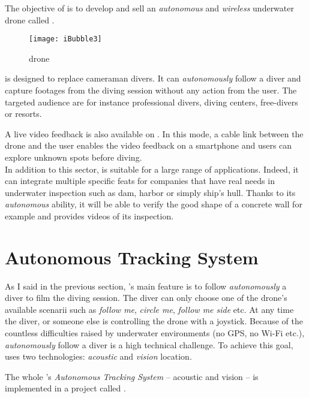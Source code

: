 The objective of \groupname{} is to develop and sell an \emph{autonomous} and \emph{wireless} underwater drone called \iBubble.

\begin{figure}[h]
\centering
\texttt{[image: iBubble3]}
\caption{\iBubble{} drone}
\end{figure}


\iBubble{} is designed to replace cameraman divers. It can \emph{autonomously} follow a diver and capture footages from the diving session without any action from the user. The targeted  audience are for instance professional divers, diving centers, free-divers or resorts.

A live video feedback is also available on \iBubble. In this mode, a cable link between the drone and the user enables the video feedback on a smartphone and users can explore unknown spots before diving.\\


In addition to this  sector, \iBubble{} is suitable for a large range of  applications. Indeed, it can integrate multiple specific feat{}s for companies that have real needs in underwater inspection such as dam, harbor or simply ship's hull. Thanks to its \emph{autonomous} ability, it will be able to verify the good shape of a concrete wall for example and provides videos of its inspection.


\section{Autonomous Tracking System}

As I said in the previous section, \iBubble's main feature is to follow \emph{autonomously} a diver to film the diving session. The diver can only choose one of the drone's available scenarii such as \emph{follow me}, \emph{circle me}, \emph{follow me side} etc. At any time the diver, or someone else is controlling the drone with a joystick. Because of the countless difficulties raised by underwater environments (no GPS, no Wi-Fi etc.), \emph{autonomously} follow a diver is a high technical challenge. To achieve this goal, \iBubble{} uses two technologies: \emph{acoustic} and \emph{vision} location.

The whole \iBubble's \emph{Autonomous Tracking System} -- acoustic and vision -- is implemented in a project called .

